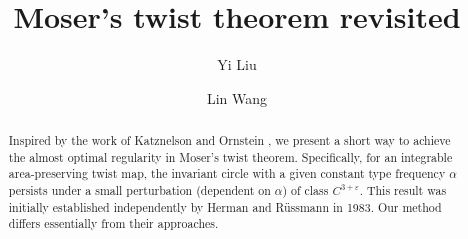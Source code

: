 \documentclass{amsart}
\theoremstyle{definition}
\newcommand{\eps}{\varepsilon}
\begin{document}
\title[Moser's twist theorem revisited ]{Moser's twist theorem revisited }

\author{Yi Liu}
\address{School of Mathematics and Statistics, Beijing Institute of Technology, Beijing 100081, China}

\author{Lin Wang}
\address{School of Mathematics and Statistics, Beijing Institute of Technology, Beijing 100081, China}





\begin{abstract} {
Inspired by the work of Katznelson and Ornstein \cite{KO1}, we present a short way to achieve the almost optimal regularity in Moser's twist theorem. Specifically, for an integrable area-preserving twist map, the invariant circle with a given constant type frequency \( \alpha \) persists under a small perturbation (dependent on \( \alpha \)) of class \( C^{3+\eps} \). This result was initially established independently by Herman \cite{H1} and R\"{u}ssmann \cite{R2} in 1983. Our method differs essentially from their approaches.
}
\end{abstract}



\maketitle



\tableofcontents
\end{document}
